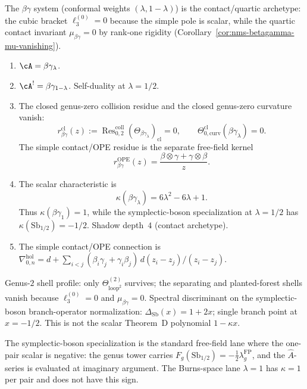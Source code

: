 \begin{computation}

\label{comp:betagamma-holographic-datum}
The $\beta\gamma$ system (conformal weights $(\lambda,1{-}\lambda)$)
is the contact/quartic archetype: the cubic bracket
$\ell_3^{(0)}=0$ because the simple pole is scalar, while the
quartic contact invariant $\mu_{\beta\gamma}=0$ by rank-one rigidity
(Corollary~\ref{cor:nms-betagamma-mu-vanishing}).
\begin{enumerate}[label=\textup{(\roman*)}]
\item $\cA = \beta\gamma_\lambda$.
\item $\cA^! = \beta\gamma_{1-\lambda}$.
 Self-duality at $\lambda=1/2$.
\item The closed genus-zero collision residue and the closed
 genus-zero curvature vanish:
 \[
 r_{\beta\gamma}^{\mathrm{cl}}(z)
 :=
 \operatorname{Res}^{\mathrm{coll}}_{0,2}
 (\Theta_{\beta\gamma_\lambda})_{\mathrm{cl}}
 =0,
 \qquad
 \Theta^{\mathrm{cl}}_{0,\mathrm{curv}}(\beta\gamma_\lambda)=0.
 \]
 The simple contact/OPE residue is the separate free-field kernel
 \[
 r_{\beta\gamma}^{\mathrm{OPE}}(z)
 =
 \frac{\beta\otimes\gamma+\gamma\otimes\beta}{z}.
 \]
\item The scalar characteristic is
 \[
 \kappa(\beta\gamma_\lambda)=6\lambda^2-6\lambda+1.
 \]
 Thus $\kappa(\beta\gamma_1)=1$, while the symplectic-boson
 specialization at $\lambda=1/2$ has
 $\kappa(\mathrm{Sb}_{1/2})=-1/2$.
 Shadow depth~$4$ (contact archetype).
\item The simple contact/OPE connection is
 $\nabla^{\mathrm{hol}}_{0,n} =
 d + \sum_{i<j}(\beta_i\gamma_j+\gamma_i\beta_j)\,
 d(z_i{-}z_j)/(z_i{-}z_j)$.
\end{enumerate}
Genus-$2$ shell profile: only
$\Theta^{(2)}_{\mathrm{loop}^2}$ survives; the separating
and planted-forest shells vanish because $\ell_3^{(0)}=0$
and $\mu_{\beta\gamma}=0$.
Spectral discriminant on the symplectic-boson branch-operator
normalization: $\Delta_{\mathrm{Sb}}(x) = 1+2x$;
single branch point at $x=-1/2$. This is not the scalar
Theorem~D polynomial $1-\kappa x$.

The symplectic-boson specialization is the standard free-field lane
where the one-pair scalar is negative: the genus tower carries
$F_g(\mathrm{Sb}_{1/2}) = -\tfrac12\lambda_g^{\mathrm{FP}}$, and the
$\hat A$-series is evaluated at imaginary argument. The Burns-space
lane $\lambda=1$ has $\kappa=1$ per pair and does not have this sign.
\end{computation}

